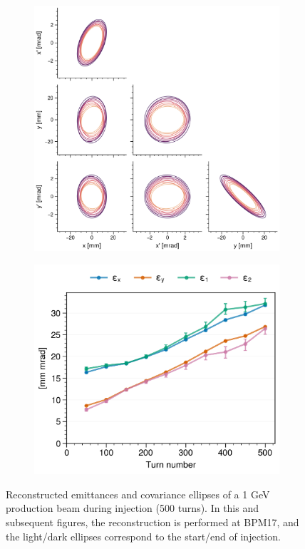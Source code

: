 %
%
\begin{figure}[!p]
    \centering
    \begin{subfigure}{0.6\textwidth}
        \includegraphics[width=\textwidth]{Images/chapter5/exp1a/corner.png}
    \end{subfigure}
    \hfill
    \begin{subfigure}[t]{0.39\textwidth}
        \includegraphics[width=\textwidth]{Images/chapter5/exp1a/emittances.png}
    \end{subfigure}
    \caption{Reconstructed emittances and covariance ellipses of a 1 GeV production beam during injection (500 turns). In this and subsequent figures, the reconstruction is performed at BPM17, and the light/dark ellipses correspond to the start/end of injection.}
    \label{fig:exp1a_emittances}
\end{figure}
